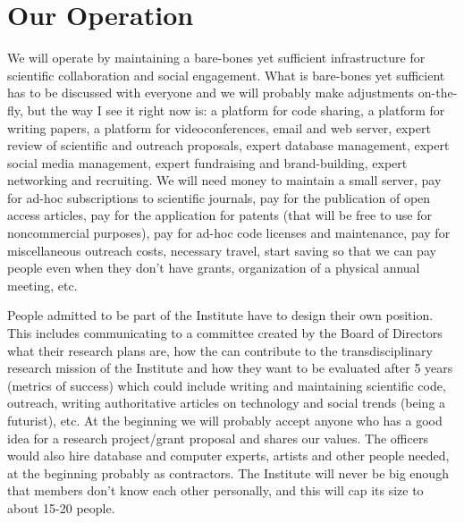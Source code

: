 \section{Our Operation}

We will operate by maintaining a bare-bones yet sufficient infrastructure for scientific collaboration and social engagement. What is bare-bones yet sufficient has to be discussed with everyone and we will probably make adjustments on-the-fly, but the way I see it right now is: a platform for code sharing, a platform for writing papers, a platform for videoconferences, email and web server, expert review of scientific and outreach proposals, expert database management, expert social media management, expert fundraising and brand-building, expert networking and recruiting. We will need money to maintain a small server, pay for ad-hoc subscriptions to scientific journals, pay for the publication of open access articles, pay for the application for patents (that will be free to use for noncommercial purposes), pay for ad-hoc code licenses and maintenance, pay for miscellaneous outreach costs, necessary travel, start saving so that we can pay people even when they don't have grants, organization of a physical annual meeting, etc. 

People admitted to be part of the Institute have to design their own position. This includes communicating to a committee created by the Board of Directors what their research plans are, how the can contribute to the transdisciplinary research mission of the Institute and how they want to be evaluated after 5 years (metrics of success) which could include writing and maintaining scientific code, outreach, writing authoritative articles on technology and social trends (being a futurist), etc. At the beginning we will probably accept anyone who has a good idea for a research project/grant proposal and shares our values. The officers would also hire database and computer experts, artists and other people needed, at the beginning probably as contractors. The Institute will never be big enough that members don't know each other personally, and this will cap its size to about 15-20 people.

